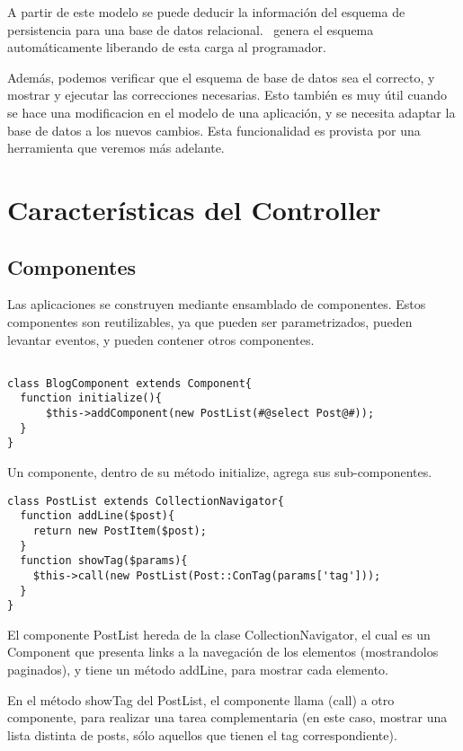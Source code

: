 A partir de este modelo se puede deducir la información del esquema de persistencia para una base de datos relacional. \PWB \ genera el esquema automáticamente liberando de esta carga al programador.

Además, podemos verificar que el esquema de base de datos sea el correcto, y mostrar y ejecutar las correcciones necesarias. Esto también es muy útil cuando se hace una modificacion en el modelo de una aplicación, y se necesita adaptar la base de datos a los nuevos cambios. Esta funcionalidad es provista por una herramienta que veremos más adelante.

\section{Características del Controller}
\subsection{Componentes}
\label{sub-comp}

Las aplicaciones se construyen mediante ensamblado de componentes. Estos componentes son reutilizables,
ya que pueden ser parametrizados, pueden levantar eventos, y pueden contener otros componentes.

\begin{verbatim}

class BlogComponent extends Component{
  function initialize(){
      $this->addComponent(new PostList(#@select Post@#));
  }
}
\end{verbatim}
Un componente, dentro de su método initialize, agrega sus sub-componentes.

\begin{verbatim}
class PostList extends CollectionNavigator{
  function addLine($post){
    return new PostItem($post);
  }
  function showTag($params){
    $this->call(new PostList(Post::ConTag(params['tag']));
  }
}

\end{verbatim}

El componente PostList hereda de la clase CollectionNavigator, el cual es un Component que presenta links a la navegación de los elementos (mostrandolos paginados), y tiene un método addLine, para mostrar cada elemento.

En el método showTag del PostList, el componente llama (call) a otro componente, para realizar una tarea complementaria (en este caso, mostrar una lista distinta de posts, sólo aquellos que tienen el tag correspondiente).

